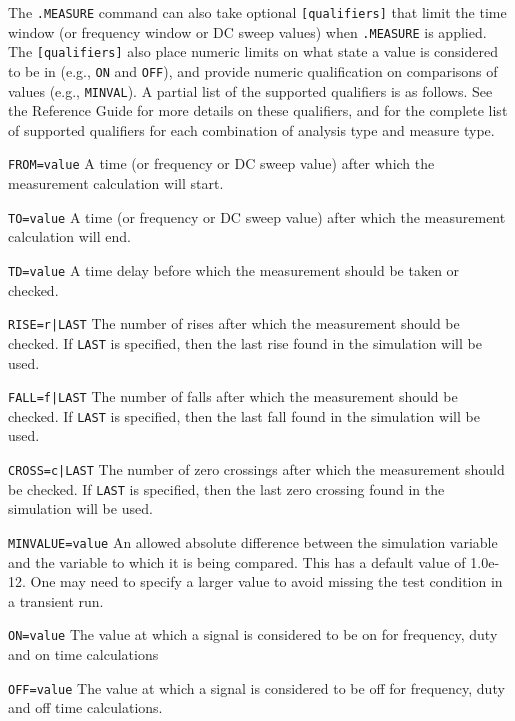 The \texttt{.MEASURE} command can also take optional \texttt{[qualifiers]} that
limit the time window (or frequency window or DC sweep values) when \texttt{.MEASURE} is 
applied. The \texttt{[qualifiers]} also place numeric limits on what state a value is
considered to be in (e.g., \texttt{ON} and \texttt{OFF}), and provide numeric
qualification on comparisons of values (e.g., \texttt{MINVAL}).  A partial list of the supported
qualifiers is as follows.  See the \Xyce{} Reference Guide\ReferenceGuide{} for more details
on these qualifiers, and for the complete list of supported qualifiers for each combination
of analysis type and measure type.

\begin{XyceItemize}
\item \texttt{FROM=value} A time (or frequency or DC sweep value) after which the 
measurement calculation will start.

\item \texttt{TO=value} A time (or frequency or DC sweep value) after which the 
measurement calculation will end.

\item \texttt{TD=value} A time delay before which the measurement should be taken or checked.

\item \texttt{RISE=r|LAST}  The number of rises after which the measurement should be checked.  If
\texttt{LAST} is specified, then the last rise found in the simulation will be used.

\item \texttt{FALL=f|LAST}
  The number of falls after which the measurement should be checked.  If
  \texttt{LAST} is specified, then the last fall found in the simulation
  will be used.

\item \texttt{CROSS=c|LAST} 
  The number of zero crossings after which the measurement should be checked.  If
  \texttt{LAST} is specified, then the last zero crossing found in the simulation
  will be used.

\item \texttt{MINVALUE=value}
  An allowed absolute difference between the simulation variable and the variable
  to which it is being compared.  This has a default value of 1.0e-12.  One 
  may need to specify a larger value to avoid missing the test condition
  in a transient run.

\item \texttt{ON=value}
  The value at which a signal is considered to be on for frequency, duty and
  on time calculations

\item \texttt{OFF=value}
  The value at which a signal is considered to be off for frequency, duty and
  off time calculations.

\end{XyceItemize}

